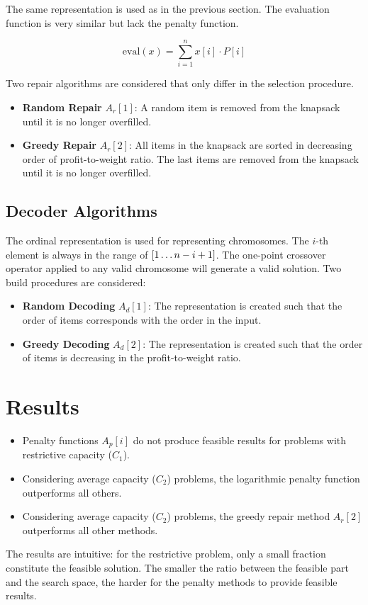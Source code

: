 \documentclass[../main.tex]{subfiles}
\begin{document}
The same representation is used as in the previous section. The evaluation function is very similar but lack the
penalty function.

\begin{equation}
\text{eval}(x) = \sum^n_{i=1} x[i] \cdot P[i]
\end{equation}

Two repair algorithms are considered that only differ in the selection procedure.

\begin{itemize}
	\item \textbf{Random Repair} $A_r[1]$: A random item is removed from the knapsack until it is no longer overfilled.
	\item \textbf{Greedy Repair} $A_r[2]$: All items in the knapsack are sorted in decreasing order of profit-to-weight
	ratio. The last items are removed from the knapsack until it is no longer overfilled.
\end{itemize}

\subsection{Decoder Algorithms}

The ordinal representation is used for representing chromosomes. The $i$-th element is always in the range of $[1
\mathellipsis n - i + 1]$. The one-point crossover operator applied to any valid chromosome will generate a valid
solution. Two build procedures are considered:

\begin{itemize}
	\item \textbf{Random Decoding} $A_d[1]$: The representation is created such that the order of items corresponds
	with the order in the input.
	\item \textbf{Greedy Decoding} $A_d[2]$: The representation is created such that the order of items is decreasing
	in the profit-to-weight ratio.
\end{itemize}

\section{Results}

\begin{itemize}
	\item Penalty functions $A_p[i]$ do not produce feasible results for problems with restrictive capacity ($C_1$).
	\item Considering average capacity ($C_2$) problems, the logarithmic penalty function outperforms all others.
	\item Considering average capacity ($C_2$) problems, the greedy repair method $A_r[2]$ outperforms all other
	methods.
\end{itemize}

The results are intuitive: for the restrictive problem, only a small fraction constitute the feasible solution. The
smaller the ratio between the feasible part and the search space, the harder for the penalty methods to provide
feasible results.
\end{document}
